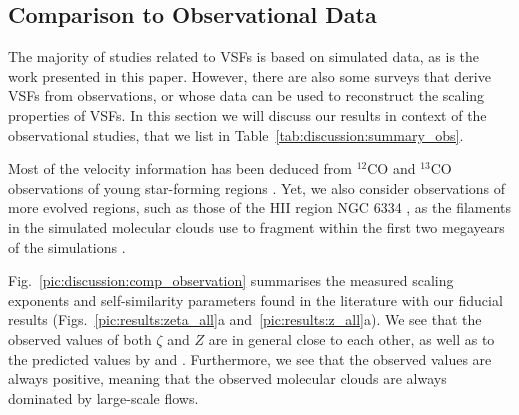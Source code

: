 \subsection{Comparison to Observational Data}\label{discussion:observation}


The majority of studies related to VSFs is based on simulated data, as is the work presented in this paper.
However, there are also some surveys that derive VSFs from observations, or whose data can be used to reconstruct the scaling properties of VSFs. 
In this section we will discuss our results in context of the observational studies, that we list in Table~\ref{tab:discussion:summary_obs}.



Most of the velocity information has been deduced from $^{12}$CO and $^{13}$CO observations of young star-forming regions \citep[e.g., Perseus and Taurus][]{Padoan2003}.
Yet, we also consider observations of more evolved regions, such as those of the HII region NGC 6334 \citep{Zernickel2015}, as the filaments in the simulated molecular clouds use to fragment within the first two megayears of the simulations .

Fig.~\ref{pic:discussion:comp_observation} summarises the measured scaling exponents and self-similarity parameters found in the literature with our fiducial results (Figs.~\ref{pic:results:zeta_all}a and~\ref{pic:results:z_all}a).
We see that the observed values of both $\zeta$ and $Z$ are in general close to each other, as well as to the predicted values by \citet{She1994} and \citet{Boldyrev2002}. 
Furthermore, we see that the observed values are always positive, meaning that the observed molecular clouds are always dominated by large-scale flows.


